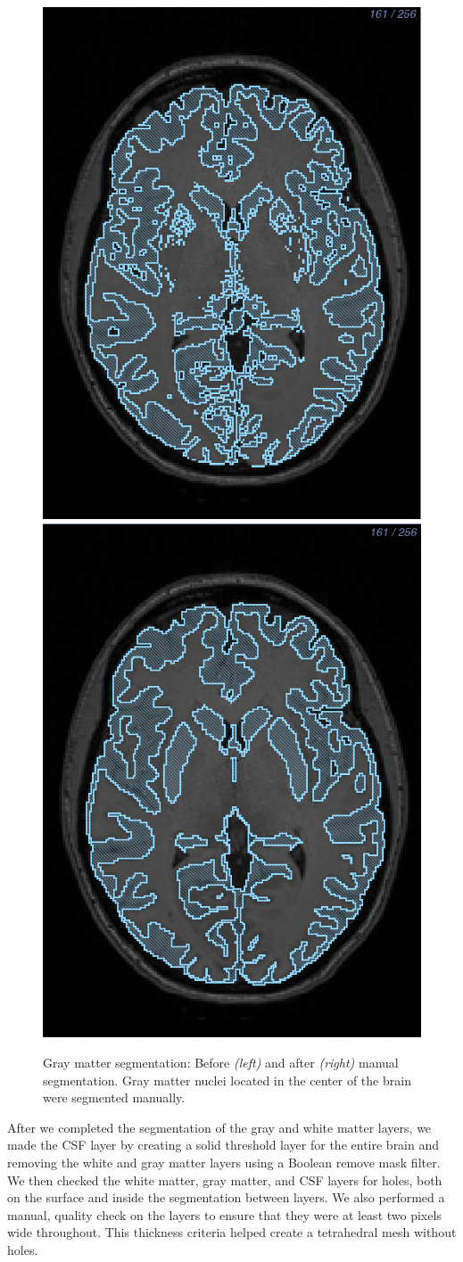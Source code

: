 \begin{figure}[H]
\begin{center}
\includegraphics[width=.49\textwidth]{Figures/greymatter_before_nuclei}
\includegraphics[width=.49\textwidth]{Figures/greymatter_added_nuclei}
\caption{Gray matter segmentation: Before \textit{(left)} and after \textit{(right)} manual segmentation. Gray matter nuclei located in the center of the brain were segmented manually.}
\label{fig:gm}
\end{center}
\end{figure}

After we completed the segmentation of the gray and white matter layers, we made the CSF layer by creating a solid threshold layer for the entire brain and removing the white and gray matter layers using a Boolean remove mask filter. We then checked the white matter, gray matter, and CSF layers for holes, both on the surface and inside the segmentation between layers. We also performed a manual, quality check on the layers to ensure that they were at least two pixels wide throughout. This thickness criteria helped create a tetrahedral mesh without holes.

